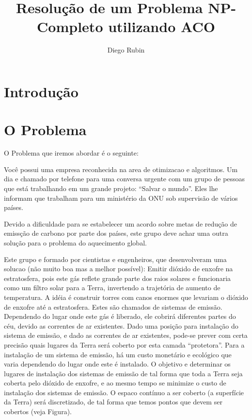 \documentclass[12pt]{article}
\title{Resolução de um Problema NP-Completo utilizando ACO}
\author{Diego Rubin\inst{1}}
\begin{document}
 

\maketitle

\begin{abstract}
\end{abstract}

\begin{resumo} 
\end{resumo}


\section{Introdução}

\section{O Problema} \label{sec:firstpage}

O Problema que iremos abordar é o seguinte:

Você possui uma empresa reconhecida na area de otimizacao e algoritmos. 
Um dia e chamado por telefone para uma conversa urgente com um grupo 
de pessoas que está trabalhando em um grande projeto: “Salvar o mundo”. 
Eles lhe informam que trabalham para um ministério da ONU sob 
supervisão de vários países.

Devido a dificuldade para se estabelecer um acordo sobre metas de 
redução de emissção de carbono por parte dos países, este grupo deve 
achar uma outra solução para o problema do aquecimento global. 

Este grupo e formado por cientistas e engenheiros, que desenvolveram
uma solucao (não muito boa mas a melhor possível): Emitir dióxido 
de enxofre na estratosfera, pois este gás reflete grande parte dos 
raios solares e funcionaria como um filtro solar para a Terra, 
invertendo a trajetória de aumento de temperatura. A idéia é construir 
torres com canos enormes que levariam o dióxido de enxofre até a estratosfera. 
Estes são chamados de sistemas de emissão. Dependendo do lugar onde 
este gás é liberado, ele cobrirá diferentes partes do céu, devido as 
correntes de ar existentes. Dado uma posição para instalação do sistema 
de emissão, e dado as correntes de ar existentes, pode-se prever com 
certa precisão quais lugares da Terra será coberto por esta camada 
“protetora”. Para a instalação de um sistema de emissão, há um custo 
monetário e ecológico que varia dependendo do lugar onde este é instalado. 
O objetivo e determinar os lugares de instalação dos sistemas de emissão 
de tal forma que toda a Terra seja coberta pelo dióxido de enxofre, e ao 
mesmo tempo se minimize o custo de instalação dos sistemas de emissão. 
O espaco contínuo a ser coberto (a superfície da Terra) será discretizado, 
de tal forma que temos pontos que devem ser cobertos (veja Figura). 
\end{document}

